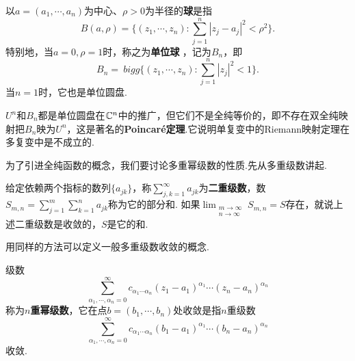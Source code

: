 以$a=(a_1,\cdots,a_n)$为中心、$\rho>0$为半径的\textbf{球}是指
\[
  B(a,\rho) = \bigg\{(z_1,\cdots,z_n):\sum_{j=1}^n|z_j-a_j|^2<\rho^2\bigg\}.
\]
特别地，当$a=0,\rho=1$时，称之为\textbf{单位球}
，记为$B_n$，即
\[
  B_n =\ bigg\{(z_1,\cdots,z_n):\sum_{j=1}^n|z_j|^2<1\bigg\}.
\]
当$n=1$时，它也是单位圆盘.

$U^n$和$B_n$都是单位圆盘在$\mathbb C^n$中的推广，但它们不是全纯等价的，即不存在双全纯映射把$B_n$映为$U^n$，这是著名的\textbf{Poincar\'e定理}.它说明单复变中的Riemann映射定理在多复变中是不成立的.

为了引进全纯函数的概念，我们要讨论多重幂级数的性质.先从多重级数讲起.

给定依赖两个指标的数列$\{a_{jk}\}$，称$\sum_{j,k=1}^\infty a_{jk}$为\textbf{二重级数}，数$S_{m,n}=\sum_{j=1}^m\sum_{k=1}^n a_{jk}$称为它的部分和. 如果$\lim_{\substack{m\to\infty\\n\to\infty}}S_{m,n}=S$存在，就说上述二重级数是收敛的，$S$是它的和.

用同样的方法可以定义一般多重级数收敛的概念.

级数
\[
  \sum_{\alpha_1,\cdots,\alpha_n=0}^\infty c_{\alpha_1\cdots\alpha_n}(z_1-a_1)
  ^{\alpha_1}\cdots(z_n-a_n)^{\alpha_n}
\]
称为\textbf{$n$重幂级数}，它在点$b=(b_1,\cdots,b_n)$处收敛是指$n$重级数
\[
  \sum_{\alpha_1,\cdots,\alpha_n=0}^\infty c_{\alpha_1\cdots\alpha_n}(b_1-a_1)
  ^{\alpha_1}\cdots(b_n-a_n)^{\alpha_n}
\]
收敛.

